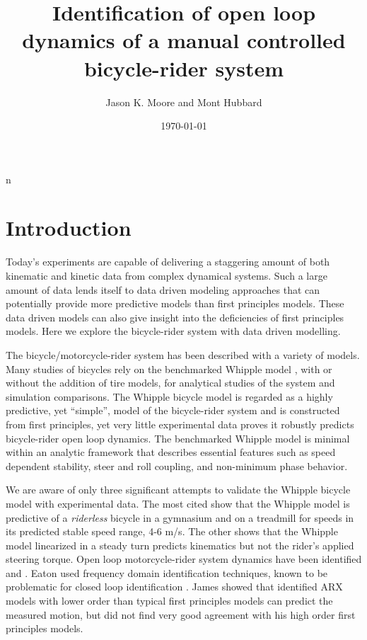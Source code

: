 \documentclass[a4paper]{article}
\title{Identification of open loop dynamics of a manual controlled bicycle-rider system
}
\author{Jason K. Moore and Mont Hubbard}
\date{\today}
\begin{document}
n
\maketitle

\section{Introduction}

Today's experiments are capable of delivering a staggering amount of
both kinematic and kinetic data from complex dynamical systems. Such a large
amount of data lends itself to data driven modeling approaches that can
potentially provide more predictive models than first principles models. These data
driven models can also give insight into the deficiencies of first principles
models. Here we explore the bicycle-rider system with data driven modelling.

The bicycle/motorcycle-rider system has been described with a variety of
models. Many
studies of bicycles rely on the benchmarked Whipple model \cite{Meijaard2007},
with or without the addition of tire models, for analytical studies of the
system and simulation comparisons. The Whipple bicycle model \cite{Whipple1899}
is regarded as a highly predictive, yet ``simple'', model of the bicycle-rider
system and is constructed from first principles, yet very little experimental
data proves it robustly predicts bicycle-rider open
loop dynamics. The benchmarked Whipple 
model \cite{Meijaard2007} is minimal within an analytic framework that describes essential features such
as speed dependent stability, steer and roll coupling, and non-minimum phase
behavior.

We are aware of only three significant attempts to validate the
Whipple bicycle model with experimental data. The most cited
\cite{Kooijman2008,Kooijman2009} show that the Whipple model is predictive of
a \emph{riderless} bicycle in a gymnasium and on a treadmill for speeds in its
predicted stable speed range, 4-6 m/s. The other \cite{Cain2012} shows that
the Whipple model linearized in a steady turn predicts kinematics
but not the rider's applied steering torque. Open loop motorcycle-rider system dynamics have been 
identified  \cite{Eaton1973} and \cite{James2002,James2005}. Eaton
used frequency domain identification techniques, known to be problematic for closed loop identification \cite{Ljung1999}.
James showed that identified ARX models with lower order than typical first
principles models can predict the measured motion, but did not find very good
agreement with his high order first principles models.
\end{document}
